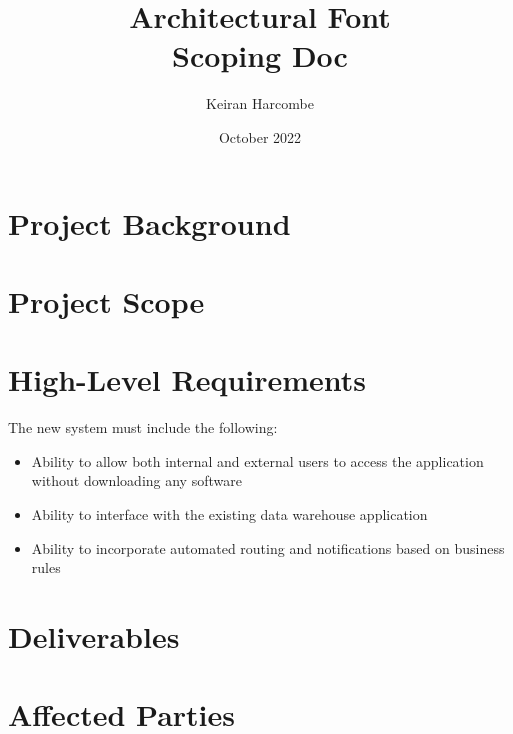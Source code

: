 \documentclass[a4paper]{article}
\title{Architectural Font \\ Scoping Doc}
\author{Keiran Harcombe}
\date{October 2022}
\begin{document}
\maketitle
\section{Project Background} %

\section{Project Scope} %

\section{High-Level Requirements} %
The new system must include the following:
\begin{itemize}
    \item Ability to allow both internal and external users to access the application without downloading any software 
    \item Ability to interface with the existing data warehouse application 
    \item Ability to incorporate automated routing and notifications based on business rules 
\end{itemize}

\section{Deliverables} %

\section{Affected Parties} %
\end{document}
